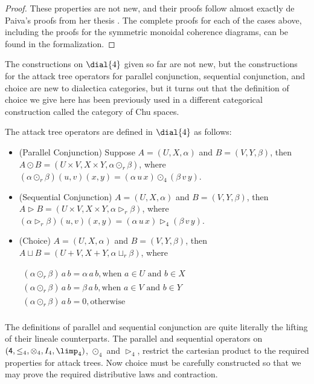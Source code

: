 \begin{proof}
  These properties are not new, and their proofs follow almost exactly
  de Paiva's proofs from her thesis \cite{?}.  The complete proofs for
  each of the cases above, including the proofs for the symmetric
  monoidal coherence diagrams, can be found in the formalization.
\end{proof}

The constructions on $\dial{4}$ given so far are not new, but the
constructions for the attack tree operators for parallel conjunction,
sequential conjunction, and choice are new to dialectica categories,
but it turns out that the definition of choice we give here has been
previously used in a different categorical construction called the
category of Chu spaces.
\begin{definition}
  \label{def:attack-tree-ops-dialectica}
  The attack tree operators are defined in $\dial{4}$ as follows:
  \begin{itemize}
  \item[] (Parallel Conjunction) Suppose $A = (U , X , \alpha)$ and $B = (V , Y , \beta)$, then
    $A \odot B = (U \times V, X \times Y, \alpha \odot_r \beta)$, where
    $(\alpha \odot_r \beta)(u , v)(x , y) = (\alpha\,u\,x) \odot_4 (\beta\,v\,y)$.\\[-5px]

  \item[] (Sequential Conjunction) $A = (U , X , \alpha)$ and $B = (V , Y , \beta)$, then
    $A \rhd B = (U \times V, X \times Y, \alpha \rhd_r \beta)$, where
    $(\alpha \rhd_r \beta)(u , v)(x , y) = (\alpha\,u\,x) \rhd_4 (\beta\,v\,y)$.\\[-5px]
    
  \item[] (Choice) $A = (U , X , \alpha)$ and $B = (V , Y , \beta)$, then
    $A \sqcup B = (U + V, X + Y, \alpha \sqcup_r \beta)$, where
    \begin{center}
      \begin{math}
        \begin{array}{lll}
          (\alpha \odot_r \beta)\,a\,b = \alpha\,a\,b, \text{when $a \in U$ and $b \in X$}\\
          (\alpha \odot_r \beta)\,a\,b = \beta\,a\,b, \text{when $a \in V$ and $b \in Y$}\\
          (\alpha \odot_r \beta)\,a\,b = 0, \text{otherwise}\\
        \end{array}
      \end{math}
    \end{center}
  \end{itemize}
\end{definition}
The definitions of parallel and sequential conjunction are quite
literally the lifting of their lineale counterparts.  The parallel and
sequential operators on $(\mathsf{4}, \leq_4,\otimes_4,I_4,\limp_4)$,
$\odot_4$ and $\rhd_4$, restrict the cartesian product to the required
properties for attack trees.  Now choice must be carefully constructed
so that we may prove the required distributive laws and contraction.

